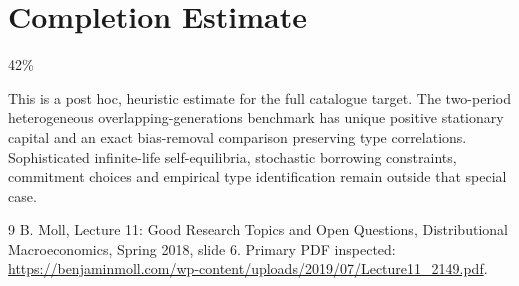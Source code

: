 \documentclass[11pt]{article}
\begin{document}
\section{Completion Estimate}
42\%

This is a post hoc, heuristic estimate for the full catalogue target.
The two-period heterogeneous overlapping-generations benchmark has unique positive stationary capital and an exact bias-removal comparison preserving type correlations. Sophisticated infinite-life self-equilibria, stochastic borrowing constraints, commitment choices and empirical type identification remain outside that special case.

\begin{thebibliography}{9}
 B. Moll, Lecture 11: Good Research Topics and Open Questions, Distributional Macroeconomics, Spring 2018, slide 6. Primary PDF inspected:
\url{https://benjaminmoll.com/wp-content/uploads/2019/07/Lecture11_2149.pdf}.
\end{thebibliography}
\end{document}
